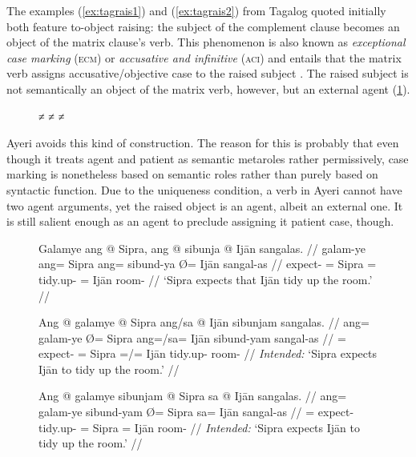 The examples (\ref{ex:tagrais1}) and (\ref{ex:tagrais2}) from Tagalog quoted
initially both feature to-object raising: the subject of the complement clause
becomes an object of the matrix clause's verb. This phenomenon is also known as
\emph{exceptional case marking} (\textsc{ecm}) or \emph{accusative and
infinitive} (\textsc{aci}) and entails that the matrix verb assigns
accusative/objective case to the raised subject \citep[439--442, 445, 451]
{carnie2013}. The raised subject is not semantically an object of the matrix
verb, however, but an external agent (\ref{ex:engraisxmps}).

\begin{figure}[h]
\pex\label{ex:engraisxmps}
\a {} ≠ 
\a {} ≠ 
\a {} ≠ 
\xe
\end{figure}

Ayeri avoids this kind of construction. The reason for this is probably that
even though it treats agent and patient as semantic metaroles rather
permissively, case marking is nonetheless based on semantic roles rather than
purely based on syntactic function. Due to the uniqueness condition, a verb in
Ayeri cannot have two agent arguments, yet the raised object is an agent,
albeit an external one. It is still salient enough as an agent to preclude
assigning it patient case, though.

\begin{figure}
\pex\label{ex:ayrrais5}
\a\label{ex:ayrrais5_1}\begingl
	\gla Galamye ang @ Sipra, ang @ sibunja {} @ Ijān sangalas. //
	\glb galam-ye ang= Sipra ang= sibund-ya Ø= Ijān sangal-as //
	\glc expect-\TsgF{} \Aarg{}= Sipra \AgtT{}= tidy.up-\TsgM{} \Top{}= Ijān
		room-\Parg{} //
	\glft `Sipra expects that Ijān tidy up the room.' //
\endgl

\a\label{ex:ayrrais5_2}\ljudge*\begingl
	\gla Ang @ galamye {} @ Sipra ang/sa @ Ijān sibunjam sangalas. //
	\glb ang= galam-ye Ø= Sipra ang=/sa= Ijān sibund-yam sangal-as //
	\glc \AgtT{}= expect-\TsgF{} \Top{}= Sipra \Aarg{}=/\Parg{}= Ijān
		tidy.up-\Ptcp{} room-\Parg{} //
	\glft \textit{Intended:} `Sipra expects Ijān to tidy up the room.' //
\endgl

\a\label{ex:ayrrais5_3}\ljudge*\begingl
	\gla Ang @ galamye sibunjam {} @ Sipra sa @ Ijān sangalas. //
	\glb ang= galam-ye sibund-yam Ø= Sipra sa= Ijān sangal-as //
	\glc \AgtT{}= expect-\TsgF{} tidy.up-\Ptcp{} \Top{}= Sipra \Parg{}= Ijān
		room-\Parg{} //
	\glft \textit{Intended:} `Sipra expects Ijān to tidy up the room.' //
\endgl

\xe
\end{figure}

